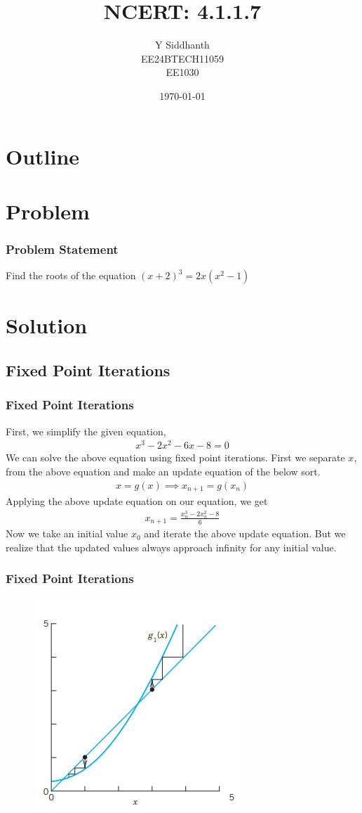 \documentclass{beamer}
\title{NCERT: 4.1.1.7}
\author{Y Siddhanth \\ EE24BTECH11059\\ EE1030}
\date{\today}
\providecommand{\brak}[1]{\ensuremath{\left(#1\right)}}
\theoremstyle{remark}
\numberwithin{equation}{section}
\begin{document}
\begin{frame}
\titlepage
\end{frame}

\section*{Outline}
\begin{frame}
\tableofcontents
\end{frame}
\section{Problem}
\begin{frame}
\frametitle{Problem Statement}
Find the roots of the equation \( (x + 2)^3 = 2x (x^2 - 1) \)
\end{frame}

\section{Solution}
\subsection{Fixed Point Iterations}
\begin{frame}
		\frametitle{Fixed Point Iterations}
	First, we simplify the given equation,
	\begin{align}
		x^3 -2x^2 - 6x - 8 = 0
	\end{align}
	We can solve the above equation using fixed point iterations. First we separate $x$, from the above equation and make an update equation of the below sort.
	\begin{align}
		x = g\brak{x} \implies x_{n+1} = g\brak{x_n}
	\end{align}
	Applying the above update equation on our equation, we get
	\begin{align}
		x_{n+1} = 	\frac{x_n^3 -2x_n^2 - 8}{6}
	\end{align}
	Now we take an initial value $x_0$ and iterate the above update equation. But we realize that the updated values always approach infinity for any initial value. \\
\end{frame}
\begin{frame}
		\frametitle{Fixed Point Iterations}
	\begin{figure}[h]
		\centering
		\includegraphics[width=0.5\linewidth]{figs/fpi.png}
		\caption{}
	\end{figure}
\end{frame}
\end{document}
